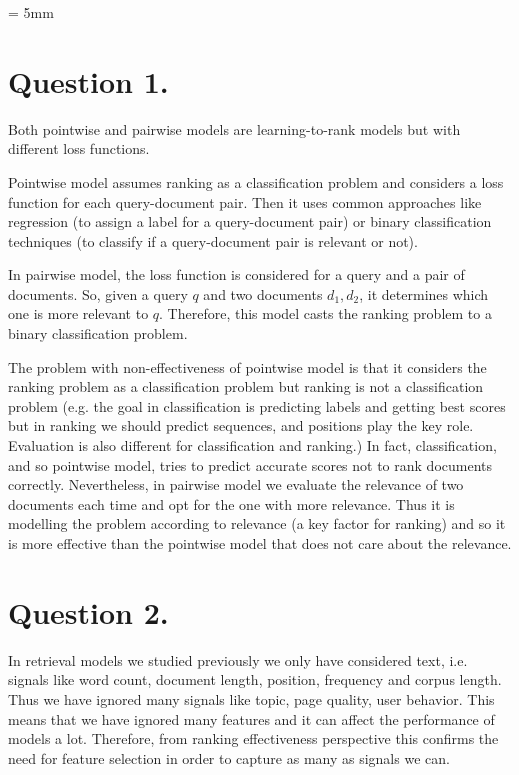 \documentclass[11pt]{article}
\begin{document}



\baselineskip = 5mm


\section*{Question 1.}%
Both pointwise and pairwise models are learning-to-rank models but with different loss functions. 

Pointwise model assumes ranking as a classification problem and considers a loss function for each query-document pair. Then it uses common approaches like regression (to assign a label for a query-document pair) or binary classification techniques (to classify if a query-document pair is relevant or not). 

In pairwise model, the loss function is considered for a query and a pair of documents. So, given a query $q$ and two documents $d_1, d_2$, it determines which one is more relevant to $q$. Therefore, this model casts the ranking problem to a binary classification problem. 

The problem with non-effectiveness of pointwise model is that it considers the ranking problem as a classification problem but ranking is not a classification problem (e.g. the goal in classification is predicting labels and getting best scores but in ranking we should predict sequences, and positions play the key role. Evaluation is also different for classification and ranking.) In fact, classification, and so pointwise model, tries to predict accurate scores not to rank documents correctly. Nevertheless, in pairwise model we evaluate the relevance of two documents each time and opt for the one with more relevance. Thus it is modelling the problem according to relevance (a key factor for ranking) and so it is more effective than the pointwise model that does not care about the relevance. 


\section*{Question 2.}
In retrieval models we studied previously we only have considered text, i.e. signals like word count, document length, position, frequency and corpus length. Thus we have ignored many signals like topic, page quality, user behavior. This means that we have ignored many features and it can affect the performance of models a lot. Therefore, from ranking effectiveness perspective this confirms the need for feature selection in order to capture as many as signals we can. 
\end{document}
